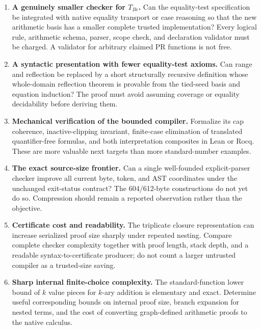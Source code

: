 \begin{enumerate}
\item \textbf{A genuinely smaller checker for $T_{B\epsilon}$.}
Can the equality-test specification be integrated with native equality transport or case reasoning so that the new arithmetic basis has a smaller complete trusted implementation? Every logical rule, arithmetic schema, parser, scope check, and declaration validator must be charged. A validator for arbitrary claimed PR functions is not free.
\item \textbf{A syntactic presentation with fewer equality-test axioms.}
Can range and reflection be replaced by a short structurally recursive definition whose whole-domain reflection theorem is provable from the tied-seed basis and equation induction? The proof must avoid assuming coverage or equality decidability before deriving them.
\item \textbf{Mechanical verification of the bounded compiler.}
Formalize its cap coherence, inactive-clipping invariant, finite-case elimination of translated quantifier-free formulas, and both interpretation composites in Lean or Rocq. These are more valuable next targets than more standard-number examples.
\item \textbf{The exact source-size frontier.}
Can a single well-founded explicit-parser checker improve all current byte, token, and AST coordinates under the unchanged exit-status contract? The 604/612-byte constructions do not yet do so. Compression should remain a reported observation rather than the objective.
\item \textbf{Certificate cost and readability.}
The triplicate closure representation can increase serialized proof size sharply under repeated nesting. Compare complete checker complexity together with proof length, stack depth, and a readable syntax-to-certificate producer; do not count a larger untrusted compiler as a trusted-size saving.
\item \textbf{Sharp internal finite-choice complexity.}
The standard-function lower bound of $k$ value pieces for $k$-ary addition is elementary and exact. Determine useful corresponding bounds on internal proof size, branch expansion for nested terms, and the cost of converting graph-defined arithmetic proofs to the native calculus.
\end{enumerate}
